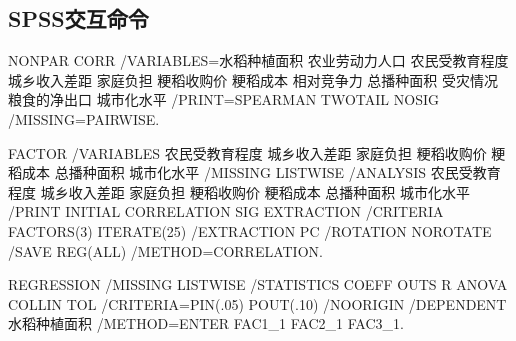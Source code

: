 \documentclass[withoutpreface,bwprint]{cumcmthesis} %
\begin{document}
\begin{appendices}
	\section{SPSS交互命令}
	\begin{spss}
	NONPAR CORR 
	  /VARIABLES=水稻种植面积 农业劳动力人口 农民受教育程度 城乡收入差距 家庭负担 粳稻收购价 粳稻成本 相对竞争力 总播种面积 受灾情况 粮食的净出口 城市化水平 
	  /PRINT=SPEARMAN TWOTAIL NOSIG 
	  /MISSING=PAIRWISE.
	\end{spss}
	\begin{spss}
	FACTOR 
	  /VARIABLES 农民受教育程度 城乡收入差距 家庭负担 粳稻收购价 粳稻成本 总播种面积 城市化水平 
	  /MISSING LISTWISE 
	  /ANALYSIS 农民受教育程度 城乡收入差距 家庭负担 粳稻收购价 粳稻成本 总播种面积 城市化水平 
	  /PRINT INITIAL CORRELATION SIG EXTRACTION 
	  /CRITERIA FACTORS(3) ITERATE(25) 
	  /EXTRACTION PC 
	  /ROTATION NOROTATE 
	  /SAVE REG(ALL) 
	  /METHOD=CORRELATION.
	\end{spss}
	\begin{spss}
	REGRESSION 
	  /MISSING LISTWISE 
	  /STATISTICS COEFF OUTS R ANOVA COLLIN TOL 
	  /CRITERIA=PIN(.05) POUT(.10) 
	  /NOORIGIN 
	  /DEPENDENT 水稻种植面积 
	  /METHOD=ENTER FAC1_1 FAC2_1 FAC3_1.
	\end{spss}
\end{appendices}
\end{document}

